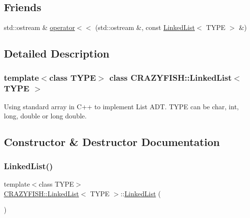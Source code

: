 \subsection*{Friends}
\begin{DoxyCompactItemize}
\item 
std\+::ostream \& \hyperlink{classCRAZYFISH_1_1LinkedList_a77f02bc38eca13d0374fd4b50b1b17a1}{operator$<$$<$} (std\+::ostream \&, const \hyperlink{classCRAZYFISH_1_1LinkedList}{Linked\+List}$<$ T\+Y\+PE $>$ \&)
\end{DoxyCompactItemize}


\subsection{Detailed Description}
\subsubsection*{template$<$class T\+Y\+PE$>$\newline
class C\+R\+A\+Z\+Y\+F\+I\+S\+H\+::\+Linked\+List$<$ T\+Y\+P\+E $>$}

Using standard array in C++ to implement List A\+DT. T\+Y\+PE can be char, int, long, double or long double. 

\subsection{Constructor \& Destructor Documentation}
\mbox{\label{classCRAZYFISH_1_1LinkedList_a8cfb7db8375d42e804107bed6ee300d8}} 
\subsubsection{\texorpdfstring{Linked\+List()}{LinkedList()}\hspace{0.1cm}{\footnotesize\ttfamily [1/3]}}
{\footnotesize\ttfamily template$<$class T\+Y\+PE$>$ \\
\hyperlink{classCRAZYFISH_1_1LinkedList}{C\+R\+A\+Z\+Y\+F\+I\+S\+H\+::\+Linked\+List}$<$ T\+Y\+PE $>$\+::\hyperlink{classCRAZYFISH_1_1LinkedList}{Linked\+List} (\begin{DoxyParamCaption}{ }\end{DoxyParamCaption})\hspace{0.3cm}{\ttfamily [inline]}}

